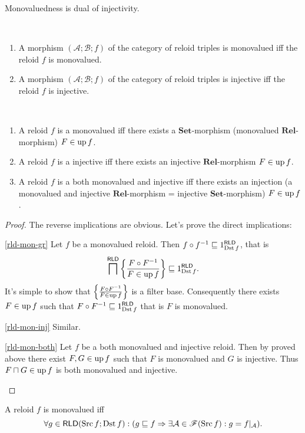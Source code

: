 Monovaluedness is dual of injectivity.
\begin{obvious}
~
\begin{enumerate}
\item A morphism $(\mathcal{A};\mathcal{B};f)$ of the category of reloid
triples is monovalued iff the reloid $f$ is monovalued.
\item A morphism $(\mathcal{A};\mathcal{B};f)$ of the category of reloid
triples is injective iff the reloid $f$ is injective.
\end{enumerate}
\end{obvious}
\begin{thm}
~
\begin{enumerate}
\item \label{rld-mon-gr}A reloid $f$ is a monovalued iff there exists
a $\mathbf{Set}$-morphism (monovalued $\mathbf{Rel}$-morphism) $F\in\operatorname{up} f$.
\item \label{rld-mon-inj}A reloid $f$ is a injective iff there exists
an injective $\mathbf{Rel}$-morphism $F\in\operatorname{up} f$.
\item \label{rld-mon-both}A reloid $f$ is a both monovalued and injective
iff there exists an injection (a monovalued and injective $\mathbf{Rel}$-morphism
= injective $\mathbf{Set}$-morphism) $F\in\operatorname{up} f$.
\end{enumerate}
\end{thm}
\begin{proof}
The reverse implications are obvious. Let's prove the direct implications:
\begin{widedisorder}
\item [{\ref{rld-mon-gr}}] Let $f$ be a monovalued reloid. Then $f\circ f^{-1}\sqsubseteq 1_{\operatorname{Dst} f}^{\mathsf{RLD}}$,
that is
\[\bigsqcap^{\mathsf{RLD}}\left\{ \frac{F\circ F^{-1}}{F\in\operatorname{up} f}\right\}\sqsubseteq 1_{\operatorname{Dst} f}^{\mathsf{RLD}}.\]
It's simple to show that $\left\{ \frac{F\circ F^{-1}}{F\in\operatorname{up} f}\right\}$ is
a filter base. Consequently there exists $F\in\operatorname{up} f$ such that $F\circ F^{-1}\sqsubseteq 1_{\operatorname{Dst} f}^{\mathsf{RLD}}$
that is $F$ is monovalued.
\item [{\ref{rld-mon-inj}}] Similar.
\item [{\ref{rld-mon-both}}] Let $f$ be a both monovalued and injective
reloid. Then by proved above there exist $F,G\in\operatorname{up} f$ such that
$F$ is monovalued and $G$ is injective. Thus $F\sqcap G\in\operatorname{up} f$
is both monovalued and injective.
\end{widedisorder}
\end{proof}
\begin{conjecture}
A reloid $f$ is monovalued iff
\[
\forall g\in\mathsf{\mathsf{RLD}}(\operatorname{Src} f;\operatorname{Dst} f):(g\sqsubseteq f\Rightarrow\exists\mathcal{A}\in\mathscr{F}(\operatorname{Src} f):g=f|_{\mathcal{A}}).
\]

\end{conjecture}

